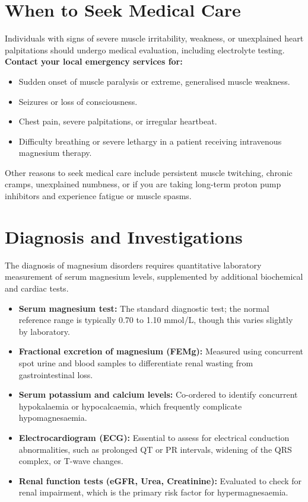 \section*{When to Seek Medical Care}
Individuals with signs of severe muscle irritability, weakness, or unexplained heart palpitations should undergo medical evaluation, including electrolyte testing.
\textbf{Contact your local emergency services for:}
\begin{itemize}
    \item Sudden onset of muscle paralysis or extreme, generalised muscle weakness.
    \item Seizures or loss of consciousness.
    \item Chest pain, severe palpitations, or irregular heartbeat.
    \item Difficulty breathing or severe lethargy in a patient receiving intravenous magnesium therapy.
\end{itemize}
Other reasons to seek medical care include persistent muscle twitching, chronic cramps, unexplained numbness, or if you are taking long-term proton pump inhibitors and experience fatigue or muscle spasms.

\section*{Diagnosis and Investigations}
The diagnosis of magnesium disorders requires quantitative laboratory measurement of serum magnesium levels, supplemented by additional biochemical and cardiac tests.
\begin{itemize}
    \item \textbf{Serum magnesium test:} The standard diagnostic test; the normal reference range is typically 0.70 to 1.10 mmol/L, though this varies slightly by laboratory.
    \item \textbf{Fractional excretion of magnesium (FEMg):} Measured using concurrent spot urine and blood samples to differentiate renal wasting from gastrointestinal loss.
    \item \textbf{Serum potassium and calcium levels:} Co-ordered to identify concurrent hypokalaemia or hypocalcaemia, which frequently complicate hypomagnesaemia.
    \item \textbf{Electrocardiogram (ECG):} Essential to assess for electrical conduction abnormalities, such as prolonged QT or PR intervals, widening of the QRS complex, or T-wave changes.
    \item \textbf{Renal function tests (eGFR, Urea, Creatinine):} Evaluated to check for renal impairment, which is the primary risk factor for hypermagnesaemia.
\end{itemize}

